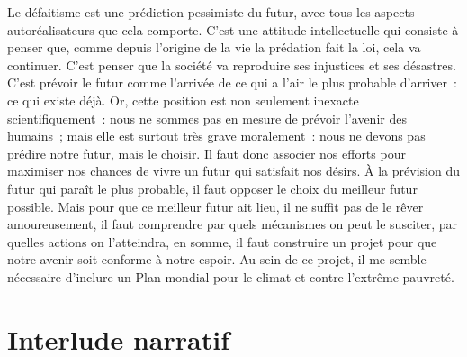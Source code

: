 \documentclass[a5paper,french,openany]{memoir}
\begin{document}
Le défaitisme %
est une prédiction pessimiste du futur, avec tous les aspects autoréalisateurs que cela comporte. C'est une attitude intellectuelle qui consiste à penser que, comme depuis l'origine de la vie la prédation fait la loi, cela va continuer. C'est penser %
que la société va reproduire ses injustices et ses désastres. C'est prévoir le futur comme l'arrivée de ce qui a l'air le plus probable d'arriver~: ce qui existe déjà. Or, cette position est non seulement inexacte scientifiquement~: nous ne sommes pas en mesure de prévoir l'avenir des humains~; mais elle est surtout très grave moralement~: nous ne devons pas prédire notre futur, mais le choisir. %
Il faut donc associer nos efforts pour maximiser nos chances de vivre un futur qui satisfait nos désirs. À la prévision du futur qui paraît le plus probable, il faut opposer le choix du meilleur futur possible. Mais pour que ce meilleur futur ait lieu, il ne suffit pas de le rêver amoureusement, il faut comprendre par quels mécanismes on peut le susciter, par quelles actions on l'atteindra, en somme, il faut construire un projet pour que notre avenir soit conforme à notre espoir.
%
Au sein de ce projet, il me semble nécessaire d'inclure un Plan mondial pour le climat et contre l'extrême pauvreté.

\chapter{Interlude narratif}
\end{document}
